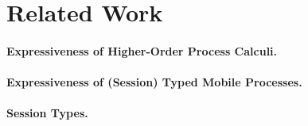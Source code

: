 \section{Related Work}

\paragraph{Expressiveness of Higher-Order Process Calculi.}


\paragraph{Expressiveness of (Session) Typed Mobile Processes.}


\paragraph{Session Types.}